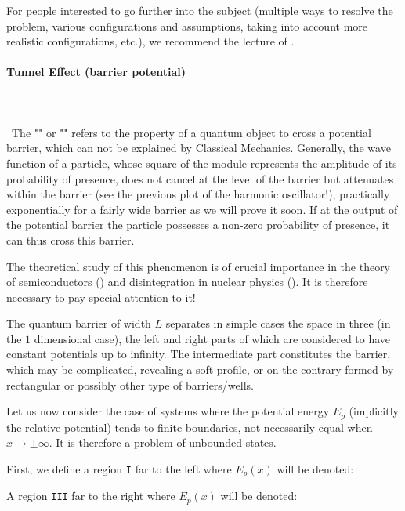 	For people interested to go further into the subject (multiple ways to resolve the problem, various configurations and assumptions, taking into account more realistic configurations, etc.), we recommend the lecture of \cite{milton2001casimir}.
	
	\paragraph{Tunnel Effect (barrier potential)}\mbox{}\\\\\
	The "" or "" refers to the property of a quantum object to cross a potential barrier, which can not be explained by Classical Mechanics. Generally, the wave function of a particle, whose square of the module represents the amplitude of its probability of presence, does not cancel at the level of the barrier but attenuates within the barrier (see the previous plot of the harmonic oscillator!), practically exponentially for a fairly wide barrier as we will prove it soon. If at the output of the potential barrier the particle possesses a non-zero probability of presence, it can thus cross this barrier.

	The theoretical study of this phenomenon is of crucial importance in the theory of semiconductors () and disintegration in nuclear physics (). It is therefore necessary to pay special attention to it!

	The quantum barrier of width $L$ separates in simple cases the space in three (in the $1$ dimensional case), the left and right parts of which are considered to have constant potentials up to infinity. The intermediate part constitutes the barrier, which may be complicated, revealing a soft profile, or on the contrary formed by rectangular or possibly other type of barriers/wells.

	Let us now consider the case of systems where the potential energy $E_p$ (implicitly the relative potential) tends to finite boundaries, not necessarily equal when $x\rightarrow \pm \infty$. It is therefore a problem of unbounded states.

	First, we define a region \texttt{I} far to the left where $E_p(x)$ will be denoted:
	
	A region \texttt{III} far to the right where $E_p(x)$ will be denoted:
	
